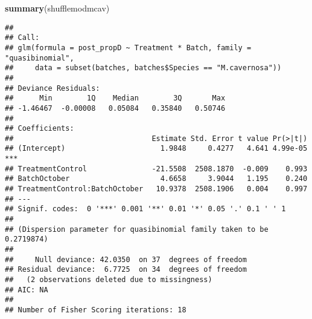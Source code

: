 \documentclass[]{article}
\newenvironment{Shaded}{\begin{snugshade}}{\end{snugshade}}
\newcommand{\KeywordTok}[1]{\textcolor[rgb]{0.13,0.29,0.53}{\textbf{#1}}}
\newcommand{\NormalTok}[1]{#1}
\begin{document}
\begin{Shaded}
\begin{Highlighting}[]
\KeywordTok{summary}\NormalTok{(shufflemodmcav)}
\end{Highlighting}
\end{Shaded}

\begin{verbatim}
## 
## Call:
## glm(formula = post_propD ~ Treatment * Batch, family = "quasibinomial", 
##     data = subset(batches, batches$Species == "M.cavernosa"))
## 
## Deviance Residuals: 
##      Min        1Q    Median        3Q       Max  
## -1.46467  -0.00008   0.05084   0.35840   0.50746  
## 
## Coefficients:
##                                Estimate Std. Error t value Pr(>|t|)    
## (Intercept)                      1.9848     0.4277   4.641 4.99e-05 ***
## TreatmentControl               -21.5508  2508.1870  -0.009    0.993    
## BatchOctober                     4.6658     3.9044   1.195    0.240    
## TreatmentControl:BatchOctober   10.9378  2508.1906   0.004    0.997    
## ---
## Signif. codes:  0 '***' 0.001 '**' 0.01 '*' 0.05 '.' 0.1 ' ' 1
## 
## (Dispersion parameter for quasibinomial family taken to be 0.2719874)
## 
##     Null deviance: 42.0350  on 37  degrees of freedom
## Residual deviance:  6.7725  on 34  degrees of freedom
##   (2 observations deleted due to missingness)
## AIC: NA
## 
## Number of Fisher Scoring iterations: 18
\end{verbatim}
\end{document}

